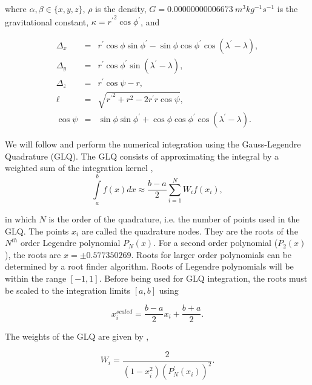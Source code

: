 \documentclass[paper,twocolumn]{geophysics}
\begin{document}
\noindent
where $\alpha, \beta \in \{x, y, z\}$,
$\rho$ is the density,
$G = 0.00000000006673\ m^3kg^{-1}s^{-1}$ is the gravitational constant,
$\kappa = {r^\prime}^2 \cos \phi^\prime$,
and

\begin{eqnarray}
    \Delta_x &=& r^\prime\cos\phi\sin\phi^\prime - \sin\phi\cos\phi^\prime
                 \cos(\lambda^\prime - \lambda), \\
    \Delta_y &=& r^\prime \cos \phi^\prime \sin(\lambda^\prime - \lambda), \\
    \Delta_z &=& r^\prime \cos \psi - r,\\
    \ell &=& \sqrt{{r^\prime}^2 + r^2 - 2 r^\prime r \cos \psi}, \\
    \cos\psi &=& \sin\phi\sin\phi^\prime + \cos\phi\cos\phi^\prime
                 \cos(\lambda^\prime - \lambda).
\end{eqnarray}

We will follow \citet{Asgharzadeh2007} and perform the numerical integration
using the Gauss-Legendre Quadrature (GLQ).
The GLQ consists of approximating the integral by a weighted sum of the
integration kernel \citep{Hildebrand1987},
\begin{equation}
    \int\limits_a^b f(x) dx \approx
    \frac{b-a}{2}\sum\limits_{i=1}^N W_i f(x_i),
    \label{eq:glq1d}
\end{equation}

\noindent
in which $N$ is the order of the quadrature,
i.e. the number of points used in the GLQ.
The points $x_i$ are called the quadrature nodes.
They are the roots of the $N^{th}$ order Legendre polynomial $P_N(x)$.
For a second order polynomial ($P_2(x)$),
the roots are $x = \pm 0.577350269$.
Roots for larger order polynomials
can be determined by a root finder algorithm.
Roots of Legendre polynomials
will be within the range $[-1, 1]$.
Before being used for GLQ integration,
the roots must be scaled to the integration limits $[a, b]$ using

\begin{equation}
    x^{scaled}_i = \frac{b - a}{2} x_i + \frac{b + a}{2}.
    \label{eq:glq_scaling}
\end{equation}

The weights of the GLQ are given by \citep{Hildebrand1987},

\begin{equation}
    W_i = \frac{2}{(1 - x_i^2)(P^\prime_N(x_i))^2}.
    \label{eq:glq_weights}
\end{equation}
\end{document}

